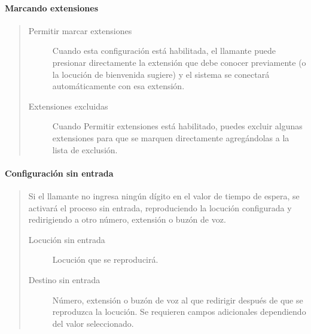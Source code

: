 \documentclass[letterpaper,10pt,spanish]{sphinxmanual}
\begin{document}
\paragraph{Marcando extensiones}
\label{administration_portal/client/vpbx/routing_endpoints/ivrs:dialing-extensions}\begin{quote}
\begin{description}
\item[{Permitir marcar extensiones}] \leavevmode
Cuando esta configuración está habilitada, el llamante puede presionar directamente la extensión que debe conocer previamente (o la locución de bienvenida sugiere) y el sistema se conectará automáticamente con esa extensión.

\item[{Extensiones excluidas}] \leavevmode
Cuando Permitir extensiones está habilitado, puedes excluir algunas extensiones para que se marquen directamente agregándolas a la lista de exclusión.

\end{description}
\end{quote}


\paragraph{Configuración sin entrada}
\label{administration_portal/client/vpbx/routing_endpoints/ivrs:no-input-configuration}\begin{quote}

Si el llamante no ingresa ningún dígito en el valor de tiempo de espera, se activará el proceso sin entrada, reproduciendo la locución configurada y redirigiendo a otro número, extensión o buzón de voz.
\begin{description}
\item[{Locución sin entrada}] \leavevmode
Locución que se reproducirá.

\item[{Destino sin entrada}] \leavevmode
Número, extensión o buzón de voz al que redirigir después de que se reproduzca la locución. Se requieren campos adicionales dependiendo del valor seleccionado.

\end{description}
\end{quote}
\end{document}
